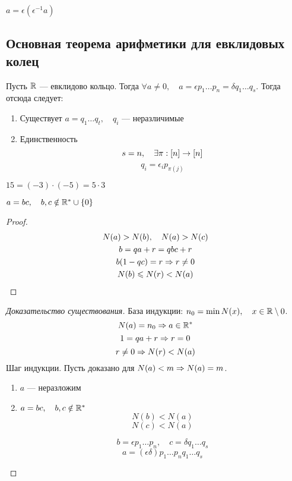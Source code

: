 \begin{example}
  $a = \epsilon (\epsilon ^{-1} a)$
\end{example}

\subsection{Основная теорема арифметики для евклидовых колец}

\begin{proposition}
  Пусть $\mathbb{R}$ --- евклидово кольцо. Тогда $\forall a \neq 0, \quad a = \epsilon p_1 \dots p_n = \delta q_1 \dots q_s$. Тогда отсюда следует:
  \begin{enumerate}
    \item Существует $a = q_1 \dots q_t, \quad q_i \text{ --- неразличимые}$
    \item Единственность
    \[s = n, \quad \exists \pi: [n] \rightarrow [n]\]
    \[q_i = \epsilon_i p_{\pi(j)}\]
  \end{enumerate}
\end{proposition}

\begin{example}
  $15 = (-3) \cdot (-5) = 5 \cdot 3$
\end{example}

\begin{lemma}[1]
  $a = bc, \quad b, c \notin \mathbb{R}^{*} \cup \{0\}$
\end{lemma}

\begin{proof}
  \begin{gather}
    N(a) > N(b), \quad N(a) > N(c) \\
    b = qa + r  = qbc + r \\
    b(1 - qc) = r \Rightarrow r \neq 0 \\
    N(b) \leqslant N(r) < N(a)
  \end{gather}
\end{proof}

\begin{proof}[Доказательство существования]  
  База индукции: $n_0 = \min N(x), \quad x \in \mathbb{R} \setminus 0$.
  \[N(a) = n_0 \Rightarrow a \in \mathbb{R}^{*}\]
  \[1 = qa + r \Rightarrow r = 0\]
  \[r \neq 0 \Rightarrow N(r) < N(a)\]
  Шаг индукции. Пусть доказано для $N(a) < m \Rightarrow N(a) = m$.
  \begin{enumerate}
    \item $a$ --- неразложим
    \item $a = bc, \quad b, c \notin \mathbb{R}^{*}$
    \[N(b) < N(a)\]
    \[N(c) < N(a)\]

    \[b = \epsilon p_1 \dots p_n, \quad c = \delta q_1 \dots q_s\]
    \[a = (\epsilon \delta) p_1 \dots p_n q_1 \dots q_s\]
  \end{enumerate}
\end{proof}

